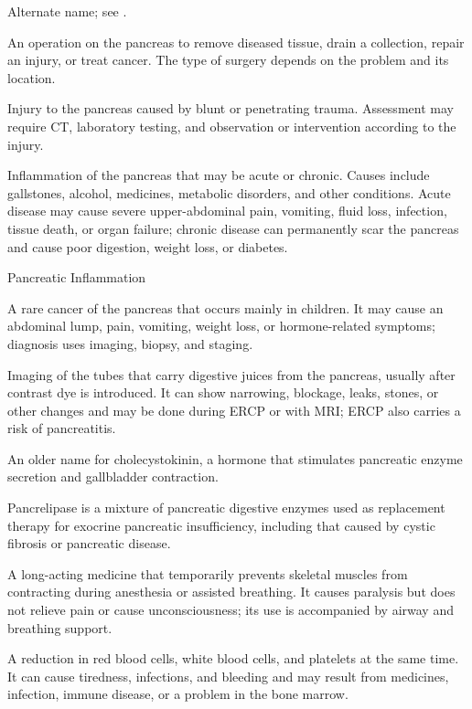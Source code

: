  Alternate name; see .

 An operation on the pancreas to remove diseased tissue, drain a collection, repair an injury, or treat cancer. The type of surgery depends on the problem and its location.

 Injury to the pancreas caused by blunt or penetrating trauma. Assessment may require CT, laboratory testing, and observation or intervention according to the injury.

 Inflammation of the pancreas that may be acute or chronic. Causes include gallstones, alcohol, medicines, metabolic disorders, and other conditions. Acute disease may cause severe upper-abdominal pain, vomiting, fluid loss, infection, tissue death, or organ failure; chronic disease can permanently scar the pancreas and cause poor digestion, weight loss, or diabetes.

\synonyms
Pancreatic Inflammation

 A rare cancer of the pancreas that occurs mainly in children. It may cause an abdominal lump, pain, vomiting, weight loss, or hormone-related symptoms; diagnosis uses imaging, biopsy, and staging.

 Imaging of the tubes that carry digestive juices from the pancreas, usually after contrast dye is introduced. It can show narrowing, blockage, leaks, stones, or other changes and may be done during ERCP or with MRI; ERCP also carries a risk of pancreatitis.

 An older name for cholecystokinin, a hormone that stimulates pancreatic enzyme secretion and gallbladder contraction.

 Pancrelipase is a mixture of pancreatic digestive enzymes used as replacement therapy for exocrine pancreatic insufficiency, including that caused by cystic fibrosis or pancreatic disease.

 A long-acting medicine that temporarily prevents skeletal muscles from contracting during anesthesia or assisted breathing. It causes paralysis but does not relieve pain or cause unconsciousness; its use is accompanied by airway and breathing support.

 A reduction in red blood cells, white blood cells, and platelets at the same time. It can cause tiredness, infections, and bleeding and may result from medicines, infection, immune disease, or a problem in the bone marrow.

